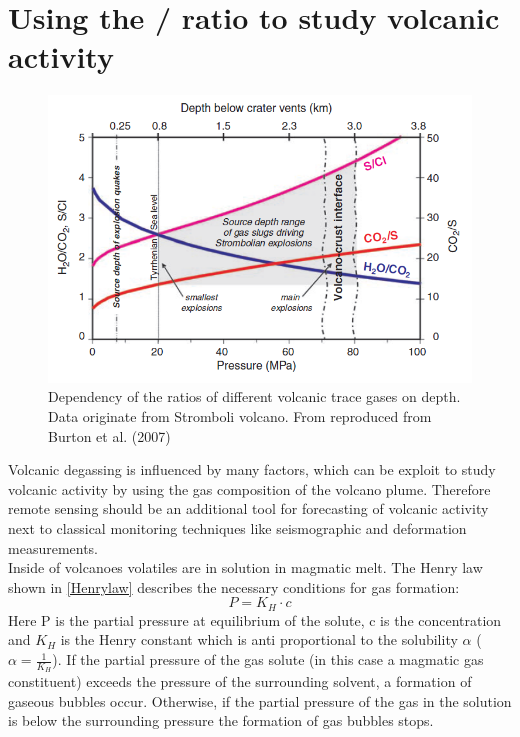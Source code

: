 \documentclass  [
  paper    = a4,
  BCOR     = 10mm,
  twoside,
  fontsize = 12pt,
  fleqn,
  toc      = bibnumbered,
  toc      = listofnumbered,
  numbers  = noendperiod,
  headings = normal,
  listof   = leveldown,
  version  = 3.03
]                                       {scrreprt}
\begin{document}
\section{Using the /  ratio to study volcanic activity}
\begin{figure}
	\centering
	\includegraphics[width=0.9\linewidth]{Zwischenbericht2018/Bilder/so2_bro}
	\caption{Dependency of the ratios of different volcanic trace gases on depth. Data originate from Stromboli volcano. From \citet{lubcke2014optical} reproduced from Burton et al. (2007)}
	\label{fig:so2bro}
\end{figure}    
	Volcanic degassing is influenced by many factors, which can be exploit to study volcanic activity by using the gas composition of the volcano plume. Therefore remote sensing should be an additional tool for forecasting of volcanic activity next to classical monitoring techniques like seismographic and deformation measurements.\\
	Inside of volcanoes volatiles are in solution in magmatic melt. The Henry law shown in \cref{Henrylaw} describes the necessary conditions for gas formation:
	\begin{equation}
	P = K_{H}\cdot c
	\label{Henrylaw}
	\end{equation}
	Here P is the partial pressure at equilibrium of the solute, c is the concentration and $ K_{H}$ is the Henry constant which is anti proportional to the solubility $\alpha$ ($\alpha = \frac{1}{ K_{H}}$).
	If the partial pressure of the gas solute (in this case a magmatic gas constituent) exceeds the pressure of the surrounding solvent, a formation of gaseous bubbles occur. Otherwise, if the partial pressure of the gas in the solution is below the surrounding pressure the formation of gas bubbles stops.\\
\end{document}

